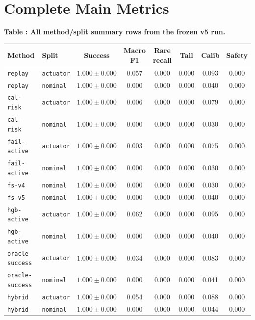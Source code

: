 \documentclass{article}
\begin{document}
\section{Complete Main Metrics}
\tiny
\setlength{\tabcolsep}{2pt}
\begin{center}
\label{tab:allmetrics}\textbf{Table \thetable: All method/split summary rows from the frozen v5 run.}\\[0.4ex]
\begin{tabular}{llcccccc}
\toprule
Method & Split & Success & Macro F1 & Rare recall & Tail & Calib & Safety \\
\midrule
\texttt{replay} & \texttt{actuator} & $1.000 \pm 0.000$ & 0.057 & 0.000 & 0.000 & 0.093 & 0.000 \\
\texttt{replay} & \texttt{nominal} & $1.000 \pm 0.000$ & 0.000 & 0.000 & 0.000 & 0.040 & 0.000 \\
\texttt{cal-risk} & \texttt{actuator} & $1.000 \pm 0.000$ & 0.006 & 0.000 & 0.000 & 0.079 & 0.000 \\
\texttt{cal-risk} & \texttt{nominal} & $1.000 \pm 0.000$ & 0.000 & 0.000 & 0.000 & 0.030 & 0.000 \\
\texttt{fail-active} & \texttt{actuator} & $1.000 \pm 0.000$ & 0.003 & 0.000 & 0.000 & 0.075 & 0.000 \\
\texttt{fail-active} & \texttt{nominal} & $1.000 \pm 0.000$ & 0.000 & 0.000 & 0.000 & 0.030 & 0.000 \\
\texttt{fs-v4} & \texttt{nominal} & $1.000 \pm 0.000$ & 0.000 & 0.000 & 0.000 & 0.030 & 0.000 \\
\texttt{fs-v5} & \texttt{nominal} & $1.000 \pm 0.000$ & 0.000 & 0.000 & 0.000 & 0.040 & 0.000 \\
\texttt{hgb-active} & \texttt{actuator} & $1.000 \pm 0.000$ & 0.062 & 0.000 & 0.000 & 0.095 & 0.000 \\
\texttt{hgb-active} & \texttt{nominal} & $1.000 \pm 0.000$ & 0.000 & 0.000 & 0.000 & 0.040 & 0.000 \\
\texttt{oracle-success} & \texttt{actuator} & $1.000 \pm 0.000$ & 0.034 & 0.000 & 0.000 & 0.083 & 0.000 \\
\texttt{oracle-success} & \texttt{nominal} & $1.000 \pm 0.000$ & 0.000 & 0.000 & 0.000 & 0.041 & 0.000 \\
\texttt{hybrid} & \texttt{actuator} & $1.000 \pm 0.000$ & 0.054 & 0.000 & 0.000 & 0.088 & 0.000 \\
\texttt{hybrid} & \texttt{nominal} & $1.000 \pm 0.000$ & 0.000 & 0.000 & 0.000 & 0.044 & 0.000 \\

\end{tabular}
\end{center}
\end{document}
